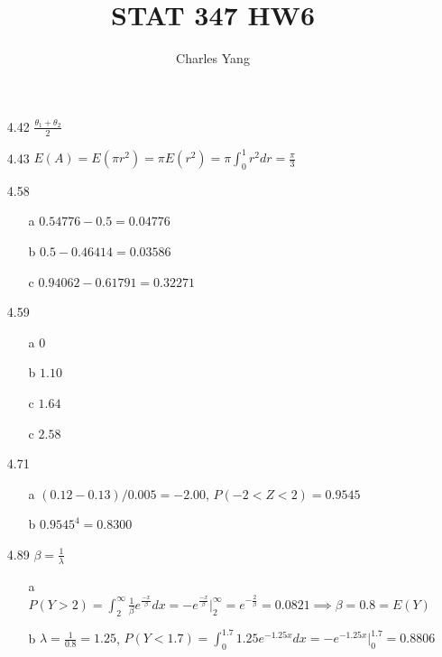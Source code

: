 \documentclass[11pt]{article}
\title{STAT 347 HW6}
\author{Charles Yang}
\begin{document}
    \maketitle

    \begin{enumerate}
        \item[4.42] $\frac{\theta_1 + \theta_2}{2}$

        \item[4.43] $E(A) = E(\pi r^2) = \pi E(r^2) = \pi \int_0^1 r^2 dr = \frac{\pi}{3}$

        \item[4.58]
        \begin{enumerate}
            \item[a] $0.54776 - 0.5 = 0.04776$
            \item[b] $0.5 - 0.46414 = 0.03586$
            \item[c] $0.94062 - 0.61791 = 0.32271$
        \end{enumerate} 

        \item[4.59]
        \begin{enumerate}
            \item[a] $0$
            \item[b] $1.10$
            \item[c] $1.64$
            \item[c] $2.58$
        \end{enumerate} 

        \item[4.71]
        \begin{enumerate}
            \item[a] $(0.12 - 0.13)/0.005 = -2.00$, $P(-2 < Z < 2) = 0.9545$
            \item[b] $0.9545^4 = 0.8300$
        \end{enumerate}

        \item[4.89] $\beta = \frac{1}{\lambda}$
        \begin{enumerate}
            \item[a] $P(Y > 2) = \int_2^{\infty} \frac{1}{\beta} e^{\frac{-x}{\beta}} dx = -e^{\frac{-x}{\beta}} |_2^{\infty} = e^{-\frac{2}{\beta}} = 0.0821 \implies \beta = 0.8 = E(Y)$
            \item[b] $\lambda = \frac{1}{0.8} = 1.25$, $P(Y < 1.7) = \int_0^{1.7} 1.25e^{-1.25x} dx = -e^{-1.25x} |_0^{1.7} = 0.8806$
        \end{enumerate}


\end{enumerate}
\end{document}
